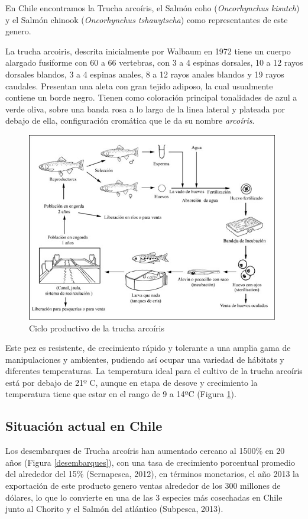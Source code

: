 \documentclass[12pt,a4paper,oneside]{scrbook}
\begin{document}
En Chile encontramos la Trucha arcoíris, el Salmón coho
(\emph{Oncorhynchus kisutch}) y el Salmón chinook (\emph{Oncorhynchus
tshawytscha}) como representantes de este genero.

La trucha arcoiris, descrita inicialmente por Walbaum en 1972 tiene un
cuerpo alargado fusiforme con 60 a 66 vertebras, con 3 a 4 espinas
dorsales, 10 a 12 rayos dorsales blandos, 3 a 4 espinas anales, 8 a 12
rayos anales blandos y 19 rayos caudales. Presentan una aleta con gran
tejido adiposo, la cual usualmente contiene un borde negro. Tienen como
coloración principal tonalidades de azul a verde oliva, sobre una banda
rosa a lo largo de la linea lateral y plateada por debajo de ella,
configuración cromática que le da su nombre \emph{arcoíris}.

\begin{figure}[h!]
    \centering
    \includegraphics[width=11cm]{1} 
    \caption {Ciclo productivo de la trucha arcoíris}
    \label {fig:ciclo}
\end{figure}

Este pez es resistente, de crecimiento rápido y tolerante a una amplia
gama de manipulaciones y ambientes, pudiendo así ocupar una variedad de
hábitats y diferentes temperaturas. La temperatura ideal para el cultivo
de la trucha arcoíris está por debajo de 21º C, aunque en etapa de
desove y crecimiento la temperatura tiene que estar en el rango de 9 a
14ºC (Figura \ref{fig:ciclo}).

\subsection{Situación actual en Chile}

Los desembarques de Trucha arcoíris han aumentado cercano al 1500\% en
20 años (Figura \ref{desembarques}), con una tasa de crecimiento
porcentual promedio del alrededor del 15\% (Sernapesca, 2012), en
términos monetarios, el año 2013 la exportación de este producto genero
ventas alrededor de los 300 millones de dólares, lo que lo convierte en
una de las 3 especies más cosechadas en Chile junto al Chorito y el
Salmón del atlántico (Subpesca, 2013).
\end{document}
